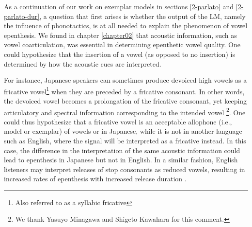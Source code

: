 As a continuation of our work on exemplar models in sections \ref{2-parlato} and \ref{2-parlato-dur}, a question that first arises is whether the output of the LM, namely the influence of phonotactics, is at all needed to explain the phenomenon of vowel epenthesis. We found in chapter \ref{chapter02} that acoustic information, such as vowel coarticulation, was essential in determining epenthetic vowel quality. One could hypothesize that the insertion of a vowel (as opposed to no insertion) is determined by how the acoustic cues are interpreted.

For instance, Japanese speakers can sometimes produce devoiced high vowels as a fricative vowel\footnote{Also referred to as a syllabic fricative} when they are preceded by a fricative consonant. In other words, the devoiced vowel becomes a prolongation of the fricative consonant, yet keeping articulatory and spectral information corresponding to the intended vowel \cite{matsui2017}\footnote{We thank Yasuyo Minagawa and Shigeto Kawahara for this comment.}. One could thus hypothesize that a fricative vowel is an acceptable allophone (i.e., model or exemplar) of vowels  or  in Japanese, while it is not in another language such as English, where the signal will be interpreted as a fricative instead. In this case, the difference in the interpretation of the same acoustic information could lead to epenthesis in Japanese but not in English. In a similar fashion, English listeners may interpret releases of stop consonants as reduced vowels, resulting in increased rates of epenthesis with increased release duration \cite{wilson2014}. 


